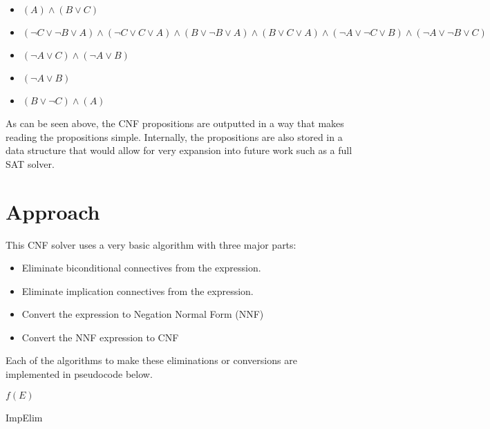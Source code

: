 \documentclass[12pt]{report}
\begin{document}
\begin{itemize}
    \setlength\itemsep{.1em}
    \item $ (A) \land (B \lor C)$
    \item $(\lnot C \lor \lnot B \lor A) \land (\lnot C \lor C \lor A) \land (B \lor \lnot B \lor A) \land (B \lor C \lor A) \land (\lnot A \lor \lnot C \lor B) \land (\lnot A \lor \lnot B \lor C)$
    \item $(\lnot A \lor C) \land (\lnot A \lor B)$
    \item $(\lnot A \lor B)$
    \item $(B \lor \lnot C) \land (A)$
\end{itemize}

\noindent As can be seen above, the CNF propositions are outputted in a way that makes reading the propositions simple. Internally, the propositions are also stored in a data structure that would allow for very expansion into future work such as a full SAT solver.
\section*{Approach}
\noindent This CNF solver uses a very basic algorithm with three major parts: \begin{itemize}
    \setlength\itemsep{.1em}
    \item Eliminate biconditional connectives from the expression.
    \item Eliminate implication connectives from the expression.
    \item Convert the expression to Negation Normal Form (NNF)
    \item Convert the NNF expression to CNF
\end{itemize}

\noindent Each of the algorithms to make these eliminations or conversions are implemented in pseudocode below.

\begin{algorithm}[H]

\KwRet $f(E)$
\caption{ImpElim}
\end{algorithm}\\
\end{document}
